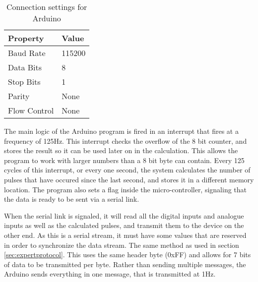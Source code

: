 \begin{table}
\begin{center}
    \begin{tabular}{|l|l|}
        \hline
        Property & Value \\ \hline
        Baud Rate    & 115200 \\
        Data Bits    & 8    \\ 
        Stop Bits    & 1    \\ 
        Parity       & None \\ 
        Flow Control & None \\
        \hline
    \end{tabular}
	\caption{Connection settings for Arduino}
\end{center}
\end{table}

The main logic of the Arduino program is fired in an interrupt that fires at a frequency of 125Hz. This interrupt checks the overflow of the 8 bit counter, and stores the result so it can be used later on in the calculation. This allows the program to work with larger numbers than a 8 bit byte can contain. Every 125 cycles of this interrupt, or every one second, the system calculates the number of pulses that have occured since the last second, and stores it in a different memory location. The program also sets a flag inside the micro-controller, signaling that the data is ready to be sent via a serial link.

When the serial link is signaled, it will read all the digital inputs and analogue inputs as well as the calculated pulses, and transmit them to the device on the other end. As this is a serial stream, it must have some values that are reserved in order to synchronize the data stream. The same method as used in section \ref{sec:expertprotocol}. This uses the same header byte (0xFF) and allows for 7 bits of data to be transmitted per byte. Rather than sending multiple messages, the Arduino sends everything in one message, that is transmitted at 1Hz.

